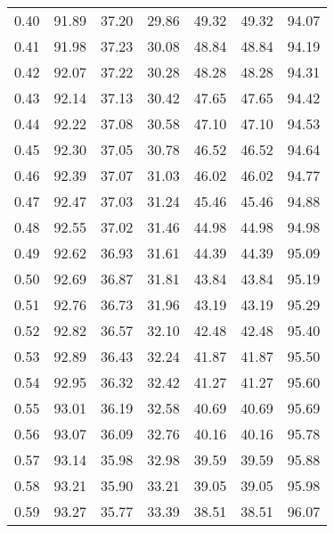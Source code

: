 \begin{tabular}{|c|c|c|c|c|c|c|}
      0.40 &     91.89 &     37.20 &      29.86 &   49.32 &      49.32 &         94.07 \\
      0.41 &     91.98 &     37.23 &      30.08 &   48.84 &      48.84 &         94.19 \\
      0.42 &     92.07 &     37.22 &      30.28 &   48.28 &      48.28 &         94.31 \\
      0.43 &     92.14 &     37.13 &      30.42 &   47.65 &      47.65 &         94.42 \\
      0.44 &     92.22 &     37.08 &      30.58 &   47.10 &      47.10 &         94.53 \\
      0.45 &     92.30 &     37.05 &      30.78 &   46.52 &      46.52 &         94.64 \\
      0.46 &     92.39 &     37.07 &      31.03 &   46.02 &      46.02 &         94.77 \\
      0.47 &     92.47 &     37.03 &      31.24 &   45.46 &      45.46 &         94.88 \\
      0.48 &     92.55 &     37.02 &      31.46 &   44.98 &      44.98 &         94.98 \\
      0.49 &     92.62 &     36.93 &      31.61 &   44.39 &      44.39 &         95.09 \\
      0.50 &     92.69 &     36.87 &      31.81 &   43.84 &      43.84 &         95.19 \\
      0.51 &     92.76 &     36.73 &      31.96 &   43.19 &      43.19 &         95.29 \\
      0.52 &     92.82 &     36.57 &      32.10 &   42.48 &      42.48 &         95.40 \\
      0.53 &     92.89 &     36.43 &      32.24 &   41.87 &      41.87 &         95.50 \\
      0.54 &     92.95 &     36.32 &      32.42 &   41.27 &      41.27 &         95.60 \\
      0.55 &     93.01 &     36.19 &      32.58 &   40.69 &      40.69 &         95.69 \\
      0.56 &     93.07 &     36.09 &      32.76 &   40.16 &      40.16 &         95.78 \\
      0.57 &     93.14 &     35.98 &      32.98 &   39.59 &      39.59 &         95.88 \\
      0.58 &     93.21 &     35.90 &      33.21 &   39.05 &      39.05 &         95.98 \\
      0.59 &     93.27 &     35.77 &      33.39 &   38.51 &      38.51 &         96.07 \\

\end{tabular}
